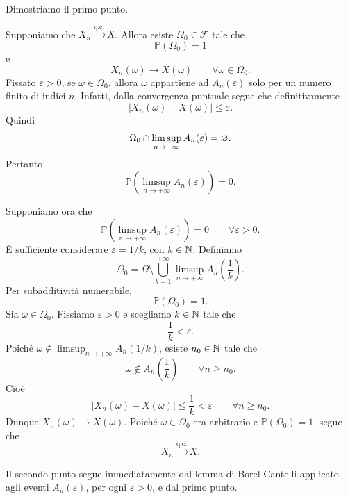 \documentclass[a4paper]{article}
\begin{document}
\begin{snippetproof}{}
    Dimostriamo il primo punto.

    \begin{iffproof}
    \item Supponiamo che \(X_n\xrightarrow{\text{q.c.}}X\). Allora esiste \(\Omega_0\in\mathcal{F}\) tale che
        \[
            \mathbb{P}(\Omega_0)=1
        \]
        e
        \[
            X_n(\omega)\longrightarrow X(\omega)
            \qquad
            \forall \omega\in\Omega_0.
        \]
        Fissato \(\varepsilon>0\), se \(\omega\in\Omega_0\), allora \(\omega\) appartiene ad \(A_n(\varepsilon)\) solo per un numero finito di indici \(n\). Infatti, dalla convergenza puntuale segue che definitivamente
        \[
            |X_n(\omega)-X(\omega)|\leq \varepsilon.
        \]
        Quindi
        \[
            \Omega_0\cap\limsup_{n\to+\infty}A_n(\varepsilon)=\varnothing.
        \]
        Pertanto
        \[
            \mathbb{P}\left(\limsup_{n\to+\infty}A_n(\varepsilon)\right)=0.
        \]

    \item Supponiamo ora che
        \[
            \mathbb{P}\left(\limsup_{n\to+\infty}A_n(\varepsilon)\right)=0
            \qquad
            \forall \varepsilon>0.
        \]
        È sufficiente considerare \(\varepsilon=1/k\), con \(k\in\mathbb{N}\). Definiamo
        \[
            \Omega_0
            =
            \Omega
            \setminus
            \bigcup_{k=1}^{+\infty}
            \limsup_{n\to+\infty}A_n\left(\frac1k\right).
        \]
        Per subadditività numerabile,
        \[
            \mathbb{P}(\Omega_0)=1.
        \]
        Sia \(\omega\in\Omega_0\). Fissiamo \(\varepsilon>0\) e scegliamo \(k\in\mathbb{N}\) tale che
        \[
            \frac1k<\varepsilon.
        \]
        Poiché \(\omega\notin\limsup_{n\to+\infty}A_n(1/k)\), esiste \(n_0\in\mathbb{N}\) tale che
        \[
            \omega\notin A_n\left(\frac1k\right)
            \qquad
            \forall n\geq n_0.
        \]
        Cioè
        \[
            |X_n(\omega)-X(\omega)|\leq \frac1k<\varepsilon
            \qquad
            \forall n\geq n_0.
        \]
        Dunque \(X_n(\omega)\to X(\omega)\). Poiché \(\omega\in\Omega_0\) era arbitrario e \(\mathbb{P}(\Omega_0)=1\), segue che
        \[
            X_n\xrightarrow{\text{q.c.}}X.
        \]
    \end{iffproof}

    Il secondo punto segue immediatamente dal lemma di Borel-Cantelli applicato agli eventi \(A_n(\varepsilon)\), per ogni \(\varepsilon>0\), e dal primo punto.


\end{snippetproof}
\end{document}
